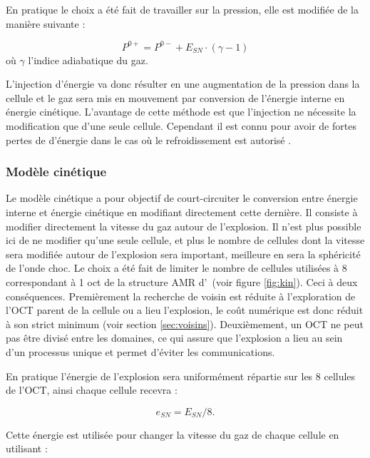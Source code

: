 En pratique le choix a été fait de travailler sur la pression, elle est modifiée de la manière suivante :

\begin{equation}
P^{0+} = P^{0-}  + E_{SN} \cdot  (\gamma-1)
\end{equation}
où $\gamma$ l'indice adiabatique du gaz.

L'injection d'énergie va donc résulter en une augmentation de la pression dans la cellule et le gaz sera mis en mouvement par conversion de l'énergie interne en énergie cinétique. 
L'avantage de cette méthode est que l'injection ne nécessite la modification que d'une seule cellule.
Cependant il est connu pour avoir de fortes pertes de d'énergie dans le cas où le refroidissement est autorisé \citep{navarro_simulations_1993}. 

\subsubsection{Modèle cinétique}

Le modèle cinétique a pour objectif de court-circuiter le conversion entre énergie interne et énergie cinétique en modifiant directement cette dernière.
Il consiste à modifier directement la vitesse du gaz autour de l'explosion. %
Il n'est plus possible ici de ne modifier qu'une seule cellule, et plus le nombre de cellules dont la vitesse sera modifiée autour de l'explosion sera important, meilleure en sera la sphéricité de l'onde choc.
Le choix a été fait de limiter le nombre de cellules utilisées à 8 correspondant à 1 oct de la structure \ac{AMR} d'\emma\ (voir figure \ref{fig:kin}).
Ceci à deux conséquences.
Premièrement la recherche de voisin est réduite à l'exploration de l'OCT parent de la cellule ou a lieu l'explosion, le coût numérique est donc réduit à son strict minimum (voir section \ref{sec:voisins}).
Deuxièmement, un OCT ne peut pas être divisé entre les domaines, ce qui assure que l'explosion a lieu au sein d'un processus unique et permet d'éviter les communications.

En pratique l'énergie de l'explosion sera uniformément répartie sur les 8 cellules de l'OCT, ainsi chaque cellule recevra : 

\begin{equation}
e_{SN} = E_{SN}/8.
\end{equation}

Cette énergie est utilisée pour changer la vitesse du gaz de chaque cellule en utilisant : 

